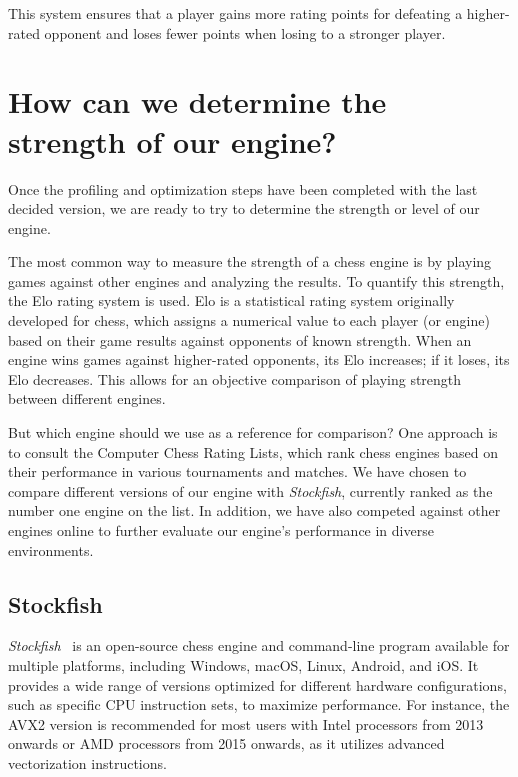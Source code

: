 This system ensures that a player gains more rating points for defeating a higher-rated opponent and loses fewer points when losing to a stronger player.

\section{How can we determine the strength of our engine?}

Once the profiling and optimization steps have been completed with the last decided version, we are ready to try to determine the strength or level of our engine.

\vspace{1em}

\noindent The most common way to measure the strength of a chess engine is by playing games against other engines and analyzing the results. To quantify this strength, the Elo rating system is used. Elo is a statistical rating system originally developed for chess, which assigns a numerical value to each player (or engine) based on their game results against opponents of known strength. When an engine wins games against higher-rated opponents, its Elo increases; if it loses, its Elo decreases. This allows for an objective comparison of playing strength between different engines.

\vspace{1em}

\noindent But which engine should we use as a reference for comparison? One approach is to consult the Computer Chess Rating Lists, which rank chess engines based on their performance in various tournaments and matches. We have chosen to compare different versions of our engine with \textit{Stockfish}, currently ranked as the number one engine on the list. In addition, we have also competed against other engines online to further evaluate our engine's performance in diverse environments.

\subsection*{Stockfish}

\textit{Stockfish}~\cite{Stockfish} is an open-source chess engine and command-line program available for multiple platforms, including Windows, macOS, Linux, Android, and iOS. It provides a wide range of versions optimized for different hardware configurations, such as specific CPU instruction sets, to maximize performance. For instance, the AVX2 version is recommended for most users with Intel processors from 2013 onwards or AMD processors from 2015 onwards, as it utilizes advanced vectorization instructions.

